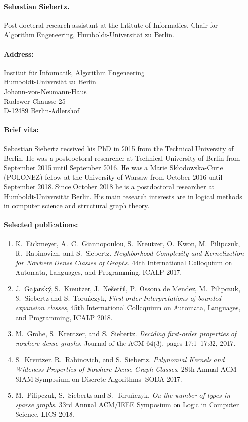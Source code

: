 \documentclass[10pt]{article}
\begin{document}
\paragraph{Sebastian Siebertz.}
Post-doctoral research assistant at the Intitute of Informatics, Chair for Algorithm Engeneering, Humboldt-Universit\"at zu Berlin.

\paragraph{Address:}

 Institut f\"ur Informatik, Algorithm Engeneering\\
Humboldt-Universi\"at zu Berlin\\
Johann-von-Neumann-Haus\\
Rudower Chausse 25\\
D-12489 Berlin-Adlershof\\


\paragraph{Brief vita:}
Sebastian Siebertz received his PhD in 2015 from the Technical
University of Berlin. He was a postdoctoral researcher at
Technical University of Berlin from September 2015 until
September 2016. He was
a Marie Skłodowska-Curie (POLONEZ) fellow at the University
of Warsaw from October 2016 until September 2018. Since
October 2018 he is a postdoctoral researcher at Humboldt-Universit\"at Berlin.
His main research interests are in logical methods in computer
science and structural graph theory.

\paragraph{Selected publications:}
\begin{enumerate}
\item K.\ Eickmeyer, A.\ C.\ Giannopoulou, S.\ Kreutzer,
O.\ Kwon, M.\ Pilipczuk, R.\ Rabinovich, and S.\ Siebertz.
\emph{Neighborhood Complexity and Kernelization for Nowhere Dense Classes of Graphs.} 44th International Colloquium on Automata, Languages, and Programming, {ICALP} 2017.
\item J.~Gajarsk{\'{y}}, S.~Kreutzer, J.~Ne{\v s}et{\v r}il, P.~Ossona de Mendez, M.~Pilipczuk, S.~Siebertz and S.~Toru{\'{n}}czyk, \emph{First-order Interpretations of bounded expansion classes},
45th International Colloquium on Automata, Languages, and Programming, ICALP 2018.
\item  M.\ Grohe, S.\ Kreutzer, and S.\ Siebertz. \emph{Deciding first-order properties of nowhere dense graphs.} Journal of the ACM 64(3), pages 17:1--17:32, 2017.
\item S.\ Kreutzer, R.\ Rabinovich, and S.\ Siebertz. \emph{Polynomial Kernels and Wideness Properties of Nowhere Dense Graph Classes.} 28th Annual ACM-SIAM Symposium on Discrete Algorithms, SODA 2017.
\item M.~Pilipczuk, S.~Siebertz and S.~Toru\'nczyk, \emph{On the number of types in sparse graphs}.
33rd Annual ACM/IEEE Symposium on Logic in Computer Science, LICS 2018.
\end{enumerate}
\end{document}
